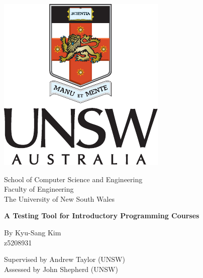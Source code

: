 \documentclass[hidelinks, 12pt]{extreport}
\begin{document}
\begin{titlepage}

\vspace{\fill}

\begin{center}
    \includegraphics{unsw}
\end{center}

\vspace{0.25cm}

\begin{center}
    \Large{}School of Computer Science and Engineering\\
    Faculty of Engineering\\
    The University of New South Wales
\end{center}

\vspace{0.4cm}

\begin{center}
    \Huge \textbf{A Testing Tool for Introductory Programming Courses}
\end{center}

\vspace{0.35cm}

\begin{center}
    \Large{}By Kyu-Sang Kim\\
    {\normalsize z5208931}
    
    \vspace{0.25cm}
    
    Supervised by Andrew Taylor (UNSW)\\
    Assessed by John Shepherd (UNSW)
\end{center}

\vspace{0.35cm}


\end{titlepage}
\end{document}
